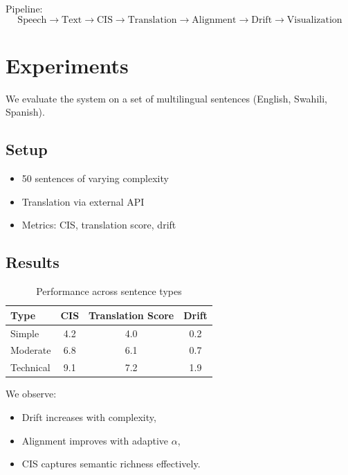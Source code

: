 \documentclass{article}
\begin{document}
Pipeline:
\[
\text{Speech} \rightarrow \text{Text} \rightarrow \text{CIS} \rightarrow \text{Translation} \rightarrow \text{Alignment} \rightarrow \text{Drift} \rightarrow \text{Visualization}
\]

\section{Experiments}

We evaluate the system on a set of multilingual sentences (English, Swahili, Spanish).

\subsection{Setup}
\begin{itemize}[noitemsep]
    \item 50 sentences of varying complexity
    \item Translation via external API
    \item Metrics: CIS, translation score, drift
\end{itemize}

\subsection{Results}

\begin{table}[htbp]
\centering
\caption{Performance across sentence types}
\begin{tabular}{lccc}
\toprule
Type & CIS & Translation Score & Drift \\
\midrule
Simple & 4.2 & 4.0 & 0.2 \\
Moderate & 6.8 & 6.1 & 0.7 \\
Technical & 9.1 & 7.2 & 1.9 \\
\bottomrule
\end{tabular}
\end{table}

We observe:
\begin{itemize}[noitemsep]
    \item Drift increases with complexity,
    \item Alignment improves with adaptive $\alpha$,
    \item CIS captures semantic richness effectively.
\end{itemize}
\end{document}
